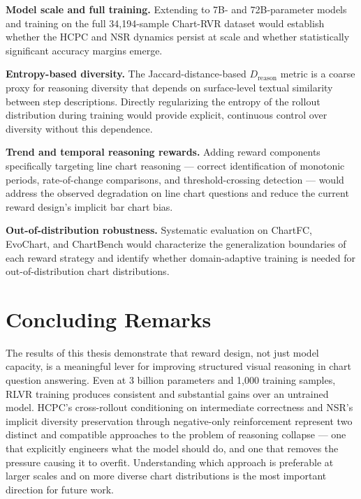 \documentclass{iutbscthesis}
\begin{document}
\textbf{Model scale and full training.} Extending to 7B- and 72B-parameter models and training on the full 34,194-sample Chart-RVR dataset would establish whether the HCPC and NSR dynamics persist at scale and whether statistically significant accuracy margins emerge.

\textbf{Entropy-based diversity.} The Jaccard-distance-based $D_{\text{reason}}$ metric is a coarse proxy for reasoning diversity that depends on surface-level textual similarity between step descriptions. Directly regularizing the entropy of the rollout distribution during training would provide explicit, continuous control over diversity without this dependence.

\textbf{Trend and temporal reasoning rewards.} Adding reward components specifically targeting line chart reasoning --- correct identification of monotonic periods, rate-of-change comparisons, and threshold-crossing detection --- would address the observed degradation on line chart questions and reduce the current reward design's implicit bar chart bias.

\textbf{Out-of-distribution robustness.} Systematic evaluation on ChartFC, EvoChart, and ChartBench would characterize the generalization boundaries of each reward strategy and identify whether domain-adaptive training is needed for out-of-distribution chart distributions.

\section{Concluding Remarks}

The results of this thesis demonstrate that reward design, not just model capacity, is a meaningful lever for improving structured visual reasoning in chart question answering. Even at 3 billion parameters and 1,000 training samples, RLVR training produces consistent and substantial gains over an untrained model. HCPC's cross-rollout conditioning on intermediate correctness and NSR's implicit diversity preservation through negative-only reinforcement represent two distinct and compatible approaches to the problem of reasoning collapse --- one that explicitly engineers what the model should do, and one that removes the pressure causing it to overfit. Understanding which approach is preferable at larger scales and on more diverse chart distributions is the most important direction for future work.


\printbib
\end{document}
